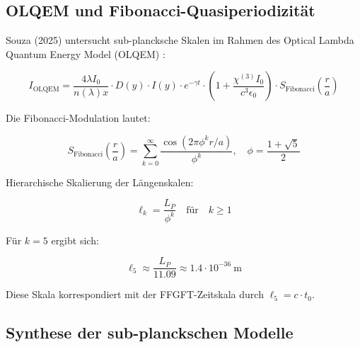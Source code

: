 	\subsection{OLQEM und Fibonacci-Quasiperiodizität}
	
	Souza (2025) untersucht sub-plancksche Skalen im Rahmen des Optical Lambda Quantum Energy Model (OLQEM) \cite{subPlanck2025}:
	
	\begin{equation}
		I_{\text{OLQEM}} = \frac{4\lambda I_0}{n(\lambda)x} \cdot D(y) \cdot I(y) \cdot e^{-\gamma t} \cdot \left(1+\frac{\chi^{(3)}I_0}{c^3\epsilon_0}\right) \cdot S_{\text{Fibonacci}}\left(\frac{r}{a}\right)
	\end{equation}
	
	Die Fibonacci-Modulation lautet:
	
	\begin{equation}
		S_{\text{Fibonacci}}\left(\frac{r}{a}\right) = \sum_{k=0}^{\infty} \frac{\cos(2\pi \phi^k r/a)}{\phi^k}, \quad \phi = \frac{1+\sqrt{5}}{2}
	\end{equation}
	
	Hierarchische Skalierung der Längenskalen:
	
	\begin{equation}
		\ell_k = \frac{L_P}{\phi^{k}} \quad \text{für} \quad k \ge 1
	\end{equation}
	
	Für $k=5$ ergibt sich:
	
	\begin{equation}
		\ell_5 \approx \frac{L_P}{11.09} \approx 1.4 \cdot 10^{-36}~\text{m}
	\end{equation}
	
	Diese Skala korrespondiert mit der FFGFT-Zeitskala durch $\ell_5 = c \cdot t_0$.
	
	\subsection{Synthese der sub-planckschen Modelle}
	
	\begin{table}[h]
		\centering
		\caption{Vergleich sub-planckscher Modelle}
		{\footnotesize{}} %
	\end{table}
	
